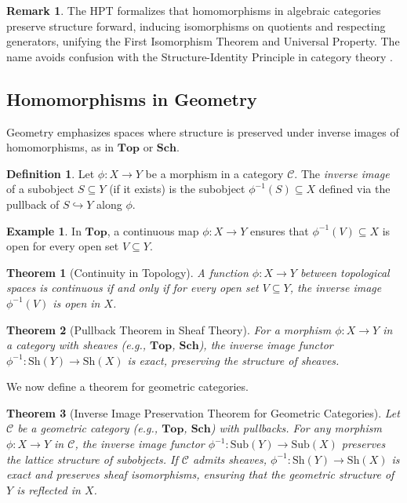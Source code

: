 \documentclass{article}
\theoremstyle{plain}
\newtheorem{theorem}{Theorem}
\theoremstyle{definition}
\newtheorem{definition}{Definition}
\newtheorem{example}{Example}
\newtheorem{remark}{Remark}
\begin{document}
\begin{remark}
The HPT formalizes that homomorphisms in algebraic categories preserve structure forward, inducing isomorphisms on quotients and respecting generators, unifying the First Isomorphism Theorem and Universal Property. The name avoids confusion with the Structure-Identity Principle in category theory \cite{mac}.
\end{remark}

\subsection{Homomorphisms in Geometry}
Geometry emphasizes spaces where structure is preserved under inverse images of homomorphisms, as in \(\mathbf{Top}\) or \(\mathbf{Sch}\).

\begin{definition}
Let \(\phi: X \to Y\) be a morphism in a category \(\mathcal{C}\). The \emph{inverse image} of a subobject \(S \subseteq Y\) (if it exists) is the subobject \(\phi^{-1}(S) \subseteq X\) defined via the pullback of \(S \hookrightarrow Y\) along \(\phi\).
\end{definition}

\begin{example}
In \(\mathbf{Top}\), a continuous map \(\phi: X \to Y\) ensures that \(\phi^{-1}(V) \subseteq X\) is open for every open set \(V \subseteq Y\).
\end{example}

\begin{theorem}[Continuity in Topology]
A function \(\phi: X \to Y\) between topological spaces is continuous if and only if for every open set \(V \subseteq Y\), the inverse image \(\phi^{-1}(V)\) is open in \(X\).
\end{theorem}

\begin{theorem}[Pullback Theorem in Sheaf Theory]
For a morphism \(\phi: X \to Y\) in a category with sheaves (e.g., \(\mathbf{Top}\), \(\mathbf{Sch}\)), the inverse image functor \(\phi^{-1}: \text{Sh}(Y) \to \text{Sh}(X)\) is exact, preserving the structure of sheaves.
\end{theorem}

We now define a theorem for geometric categories.

\begin{theorem}[Inverse Image Preservation Theorem for Geometric Categories]
Let \(\mathcal{C}\) be a geometric category (e.g., \(\mathbf{Top}\), \(\mathbf{Sch}\)) with pullbacks. For any morphism \(\phi: X \to Y\) in \(\mathcal{C}\), the inverse image functor \(\phi^{-1}: \text{Sub}(Y) \to \text{Sub}(X)\) preserves the lattice structure of subobjects. If \(\mathcal{C}\) admits sheaves, \(\phi^{-1}: \text{Sh}(Y) \to \text{Sh}(X)\) is exact and preserves sheaf isomorphisms, ensuring that the geometric structure of \(Y\) is reflected in \(X\).
\end{theorem}
\end{document}
